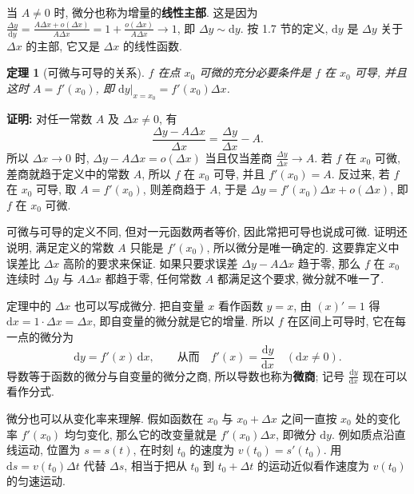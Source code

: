 \documentclass[UTF8,openany]{ctexbook}
\theoremstyle{chinesetextbook}
\newenvironment{cnproof}{\par\indent\textbf{证明:} \ignorespaces}{\par}
\newtheorem*{theoremsingle}{定理}
\newcommand{\dd}{\mathrm d}
\begin{document}
当 $A\ne0$ 时, 微分也称为增量的\textbf{线性主部}. 这是因为 $\displaystyle\frac{\Delta y}{\dd y}=\frac{A\Delta x+o(\Delta x)}{A\Delta x}=1+\frac{o(\Delta x)}{A\Delta x}\to1$, 即 $\Delta y\sim\dd y$. 按 1.7 节的定义, $\dd y$ 是 $\Delta y$ 关于 $\Delta x$ 的主部, 它又是 $\Delta x$ 的线性函数.
\begin{theoremsingle}[可微与可导的关系]
$f$ 在点 $x_0$ 可微的充分必要条件是 $f$ 在 $x_0$ 可导, 并且这时 $A=f'(x_0)$, 即 $\dd y\big|_{x=x_0}=f'(x_0)\Delta x$.
\end{theoremsingle}
\begin{cnproof}
对任一常数 $A$ 及 $\Delta x\ne0$, 有
\[
\frac{\Delta y-A\Delta x}{\Delta x}=\frac{\Delta y}{\Delta x}-A.
\]
所以 $\Delta x\to0$ 时, $\Delta y-A\Delta x=o(\Delta x)$ 当且仅当差商 $\displaystyle\frac{\Delta y}{\Delta x}\to A$. 若 $f$ 在 $x_0$ 可微, 差商就趋于定义中的常数 $A$, 所以 $f$ 在 $x_0$ 可导, 并且 $f'(x_0)=A$. 反过来, 若 $f$ 在 $x_0$ 可导, 取 $A=f'(x_0)$, 则差商趋于 $A$, 于是 $\Delta y=f'(x_0)\Delta x+o(\Delta x)$, 即 $f$ 在 $x_0$ 可微.
\end{cnproof}
可微与可导的定义不同, 但对一元函数两者等价, 因此常把可导也说成可微. 证明还说明, 满足定义的常数 $A$ 只能是 $f'(x_0)$, 所以微分是唯一确定的. 这要靠定义中误差比 $\Delta x$ 高阶的要求来保证. 如果只要求误差 $\Delta y-A\Delta x$ 趋于零, 那么 $f$ 在 $x_0$ 连续时 $\Delta y$ 与 $A\Delta x$ 都趋于零, 任何常数 $A$ 都满足这个要求, 微分就不唯一了.

定理中的 $\Delta x$ 也可以写成微分. 把自变量 $x$ 看作函数 $y=x$, 由 $(x)'=1$ 得 $\dd x=1\cdot\Delta x=\Delta x$, 即自变量的微分就是它的增量. 所以 $f$ 在区间上可导时, 它在每一点的微分为
\[
\dd y=f'(x)\,\dd x,\qquad\text{从而}\quad f'(x)=\frac{\dd y}{\dd x}\quad(\dd x\ne0).
\]
导数等于函数的微分与自变量的微分之商, 所以导数也称为\textbf{微商}; 记号 $\displaystyle\frac{\dd y}{\dd x}$ 现在可以看作分式.

微分也可以从变化率来理解. 假如函数在 $x_0$ 与 $x_0+\Delta x$ 之间一直按 $x_0$ 处的变化率 $f'(x_0)$ 均匀变化, 那么它的改变量就是 $f'(x_0)\Delta x$, 即微分 $\dd y$. 例如质点沿直线运动, 位置为 $s=s(t)$, 在时刻 $t_0$ 的速度为 $v(t_0)=s'(t_0)$. 用 $\dd s=v(t_0)\Delta t$ 代替 $\Delta s$, 相当于把从 $t_0$ 到 $t_0+\Delta t$ 的运动近似看作速度为 $v(t_0)$ 的匀速运动.
\end{document}

